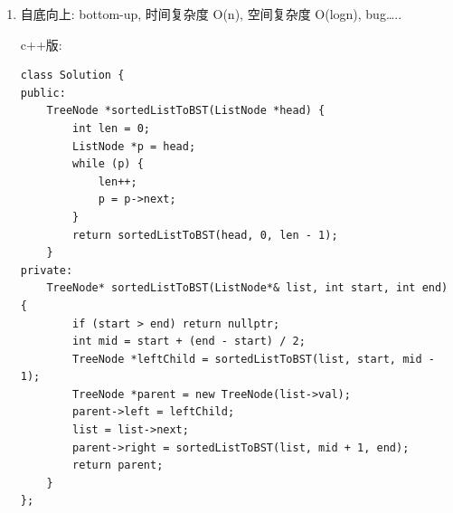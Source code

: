\documentclass[12pt]{book}
\begin{document}
\begin{enumerate}
\begin{lstlisting}
public TreeNode sortListToBST(ListNode head, int len) {
    if (len == 0) return null;
    if (len == 1) return new TreeNode(head.val);
    TreeNode root = new TreeNode(nth_node(head, len / 2 + 1).val);
    root.left = sortListToBST(head, len / 2);
    root.right = sortListToBST(nth_node(head, len / 2 + 2), (len - 1) / 2);
    return root;
}
        
public TreeNode sortedListToBST(ListNode head) {
    return sortListToBST(head, listLength(head));
}
\end{lstlisting}

换一种方式，如果我只走一遍 list,那可以把数据存在一个数组中，方便O（1）
时间获得数据。自已写的乱代码。

\lstset{language=java,label= ,caption= ,numbers=none}
\begin{lstlisting}
public TreeNode createMyTree(ListNode [] num, int bgn, int end) {
    TreeNode root = null;
    if (bgn == end) {
        root = new TreeNode(num[end].val);
        return root;
    }
    if (bgn < end) {
        int mid = bgn + (end - bgn) / 2;
        root = new TreeNode(num[mid].val);
        root.left = createMyTree(num, bgn, mid - 1);
        root.right = createMyTree(num, mid + 1, end);
        return root;
    }
    return null;
}

public TreeNode sortedListToBST(ListNode head) {
    TreeNode root = null;
    if (head == null) return null;
    else if (head.next == null) {
        root = new TreeNode(head.val);
        return root;   
    }
    ListNode [] num = new ListNode[100000]; // 10,0000 works, 50000 doesn't
    ListNode curr = head;
    int idx = 0;
    while (curr != null) {
        num[idx++] = curr;
        curr = curr.next;
    }
    root = createMyTree(num, 0, idx - 1);
    return root;
}
\end{lstlisting}

\item 自底向上: bottom-up, 时间复杂度 O(n), 空间复杂度 O(logn), bug\ldots{}..
\label{sec-4-4-3-2}

c++版:
\lstset{language=java,label= ,caption= ,numbers=none}
\begin{lstlisting}
class Solution {
public:
    TreeNode *sortedListToBST(ListNode *head) {
        int len = 0;
        ListNode *p = head;
        while (p) {
            len++;
            p = p->next;
        }
        return sortedListToBST(head, 0, len - 1);
    }
private:
    TreeNode* sortedListToBST(ListNode*& list, int start, int end) {
        if (start > end) return nullptr;
        int mid = start + (end - start) / 2;
        TreeNode *leftChild = sortedListToBST(list, start, mid - 1);
        TreeNode *parent = new TreeNode(list->val);
        parent->left = leftChild;
        list = list->next;
        parent->right = sortedListToBST(list, mid + 1, end);
        return parent;
    }
};
\end{lstlisting}


\end{enumerate}
\end{document}

